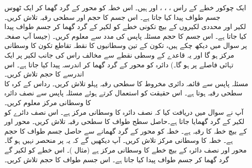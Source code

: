 ایک چوکور خطے کے راس ، ، ،  اور  ہیں۔ اس خطہ کو محور  کے گرد گھما کر ایک ٹھوس جسم طواف پیدا کیا جاتا ہے۔ اس جسم کا حجم اور سطحی رقبہ تلاش کریں۔\\
لکیر  اور محددی لکیروں کے بیچ تکونی خطے  کو لکیر  کے گرد گھما کر جسم طواف پیدا کیا جاتا ہے۔ اس جسم کا حجم مسئلہ پاپس کی مدد سے معلوم کریں۔ (جیسا آپ صفحہ  پر سوال  میں دیکھ چکے ہیں، تکون کے تین وسطانیوں کا نقطہ تقاطع تکون کا وسطانی مرکز ہو گا اور یہ قاعدے  کے وسطی نقطے سے مخالف راس کی جانب لکیر پر  ایک تہائی فاصلے  پر ہو گا۔)
دائرہ  کو محور  کے گرد گھما کر اندرسہ پیدا کیا جاتا ہے۔ اس اندرسے  کا حجم تلاش کریں۔\\
مسئلہ پاپس  سے قائمہ دائری مخروط کا سطحی رقبہ پہلو تلاش کریں۔
رداس  کے کرہ کا سطحی رقبہ  ہوتا ہے۔ اس حقیقت کو استعمال کرتے ہوئے مسئلہ پاپس سے نصف دائرہ  کا وسطانی مرکز معلوم کریں۔\\
آپ نے سوال  میں دریافت کیا کہ نصف دائرہ  کا وسطانی مرکز  ہے۔ اس نصف دائرے  کو لکیر  کے گرد گھمایا جاتا ہے۔حاصل سطح طواف کا سطحی رقبہ تلاش کریں۔
محور  اور  کے بیچ خطہ  کا رقبہ  ہے۔ خطہ  کو محور  کے گرد گھمانے سے حاصل جسم طواف کا حجم  ہے۔ خطہ  کا وسطانی مرکز تلاش کریں۔ آپ دیکھیں گے کہ یہ  پر منحصر نہیں ہو گا۔\\
محور  اور نصف دائرہ  کے بیچ خطے کا وسطانی مرکز  ہے (مثال )۔ اس خطے  کو لکیر  گے گرد گھما کر جسم طواف پیدا کیا جاتا ہے۔ اس جسم طواف کا حجم تلاش کریں۔
